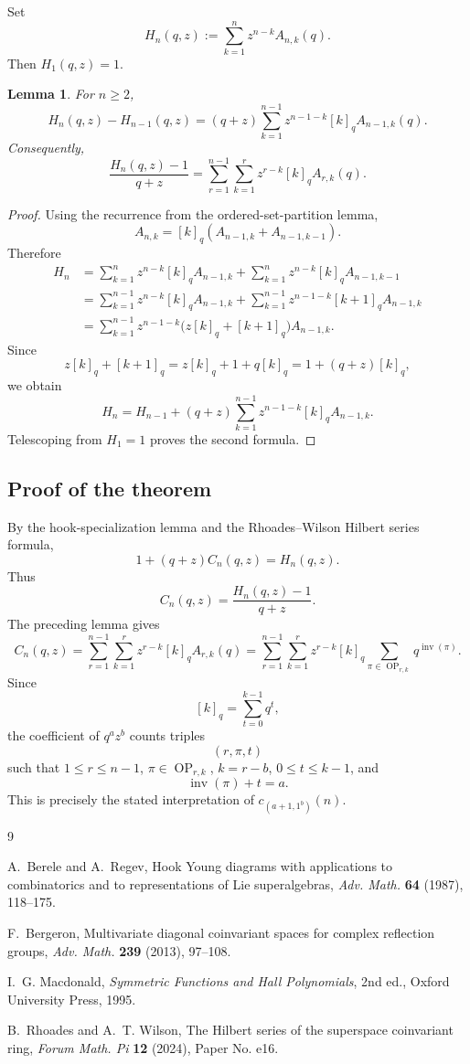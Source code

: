 \documentclass[12pt]{article}
\newtheorem{lemma}[theorem]{Lemma}
\DeclareMathOperator{\Inv}{inv}
\DeclareMathOperator{\OP}{OP}
\begin{document}
Set
\[
H_n(q,z):=\sum_{k=1}^{n}z^{n-k}A_{n,k}(q).
\]
Then \(H_1(q,z)=1\).

\begin{lemma}
For \(n\geq 2\),
\[
H_n(q,z)-H_{n-1}(q,z)
=
(q+z)\sum_{k=1}^{n-1} z^{n-1-k}[k]_q A_{n-1,k}(q).
\]
Consequently,
\[
\frac{H_n(q,z)-1}{q+z}
=
\sum_{r=1}^{n-1}\sum_{k=1}^{r}
z^{r-k}[k]_q A_{r,k}(q).
\]
\end{lemma}

\begin{proof}
Using the recurrence from the ordered-set-partition lemma,
\[
A_{n,k}=[k]_q(A_{n-1,k}+A_{n-1,k-1}).
\]
Therefore
\[
\begin{aligned}
H_n
&=
\sum_{k=1}^{n} z^{n-k}[k]_qA_{n-1,k}
+
\sum_{k=1}^{n} z^{n-k}[k]_qA_{n-1,k-1}  \\
&=
\sum_{k=1}^{n-1} z^{n-k}[k]_qA_{n-1,k}
+
\sum_{k=1}^{n-1} z^{n-1-k}[k+1]_qA_{n-1,k} \\
&=
\sum_{k=1}^{n-1} z^{n-1-k}
\bigl(z[k]_q+[k+1]_q\bigr)A_{n-1,k}.
\end{aligned}
\]
Since
\[
z[k]_q+[k+1]_q
=
z[k]_q+1+q[k]_q
=
1+(q+z)[k]_q,
\]
we obtain
\[
H_n
=
H_{n-1}
+
(q+z)\sum_{k=1}^{n-1} z^{n-1-k}[k]_qA_{n-1,k}.
\]
Telescoping from \(H_1=1\) proves the second formula.
\end{proof}

\subsection{Proof of the theorem}

By the hook-specialization lemma and the Rhoades--Wilson Hilbert series formula,
\[
1+(q+z)C_n(q,z)
=
H_n(q,z).
\]
Thus
\[
C_n(q,z)=\frac{H_n(q,z)-1}{q+z}.
\]
The preceding lemma gives
\[
C_n(q,z)
=
\sum_{r=1}^{n-1}\sum_{k=1}^{r}
z^{r-k}[k]_qA_{r,k}(q)
=
\sum_{r=1}^{n-1}\sum_{k=1}^{r}
z^{r-k}[k]_q
\sum_{\pi\in \OP_{r,k}}q^{\Inv(\pi)}.
\]
Since
\[
[k]_q=\sum_{t=0}^{k-1}q^t,
\]
the coefficient of \(q^a z^b\) counts triples
\[
(r,\pi,t)
\]
such that \(1\leq r\leq n-1\), \(\pi\in \OP_{r,k}\), \(k=r-b\), \(0\leq t\leq k-1\),
and
\[
\Inv(\pi)+t=a.
\]
This is precisely the stated interpretation of \(c_{(a+1,1^b)}(n)\).

\begin{thebibliography}{9}

A.~Berele and A.~Regev,
\newblock Hook Young diagrams with applications to combinatorics and to representations of Lie superalgebras,
\newblock \emph{Adv. Math.} \textbf{64} (1987), 118--175.

F.~Bergeron,
\newblock Multivariate diagonal coinvariant spaces for complex reflection groups,
\newblock \emph{Adv. Math.} \textbf{239} (2013), 97--108.

I.~G. Macdonald,
\newblock \emph{Symmetric Functions and Hall Polynomials},
\newblock 2nd ed., Oxford University Press, 1995.

B.~Rhoades and A.~T. Wilson,
\newblock The Hilbert series of the superspace coinvariant ring,
\newblock \emph{Forum Math. Pi} \textbf{12} (2024), Paper No. e16.

\end{thebibliography}
\end{document}
